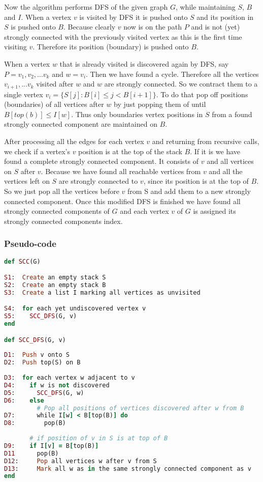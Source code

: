 \documentclass{report}
\theoremstyle{plain}
\theoremstyle{definition}
\theoremstyle{remark}
\numberwithin{definition}{chapter}
\numberwithin{example}{chapter}
\numberwithin{figure}{chapter}
\begin{document}
Now the algorithm performs DFS of the given graph $G$, while maintaining $S$, $B$ and $I$. When a vertex $v$ is visited by DFS it is pushed onto $S$ and its position in $S$ is pushed onto $B$. Because clearly $v$ now is on the path $P$ and is not (yet) strongly connected with the previously visited vertex as this is the first time visiting $v$. Therefore its position (boundary) is pushed onto $B$.

When a vertex $w$ that is already visited is discovered again by DFS, say $P=v_1,v_2,...v_k$ and $w=v_i$. Then we have found a cycle. Therefore all the vertices $v_{i+1},...v_k$ visited after $w$ and $w$ are strongly connected. So we contract them to a single vertex $v_i=\{ S[j] : B[i] \leq j < B[i+1] \}$. To do that pop off positions (boundaries) of all vertices after $w$ by just popping them of until $B[top(b)] \leq I[w]$. Thus only boundaries vertex positions in $S$ from a found strongly connected component are maintained on $B$.

After processing all the edges for each vertex $v$ and returning from recursive calls, we check if a vertex's $v$ position is at the top of the stack $B$. If it is we have found a complete strongly connected component. It consists of $v$ and all vertices on $S$ after $v$. Because we have found all reachable vertices from $v$ and all the vertices left on $S$ are strongly connected to $v$, since its position is at the top of $B$. So we just pop all the vertices before $v$ from S and add them to a new strongly connected component. Once this modified DFS is finished we have found all strongly connected components of $G$ and each vertex $v$ of $G$ is assigned its strongly connected components index.

\subsubsection*{Pseudo-code}

\begin{lstlisting}[language=Ruby]
def SCC(G)

S1:  Create an empty stack S
S2:  Create an empty stack B
S3:  Create a list I marking all vertices as unvisited

S4:  for each yet undiscovered vertex v
S5:    SCC_DFS(G, v)
end

def SCC_DFS(G, v)
  
D1:  Push v onto S
D2:  Push top(S) on B
  
D3:  for each vertex w adjacent to v
D4:    if w is not discovered
D5:      SCC_DFS(G, w)
D6:    else
         # Pop all positions of vertices discovered after w from B
D7:      while I[w] < B[top(B)] do
D8:        pop(B)
  
       # if position of v in S is at top of B
D9:    if I[v] = B[top(B)]
D11      pop(B)
D12:     Pop all vertices w after v from S
D13:     Mark all w as in the same strongly connected component as v
end
\end{lstlisting}
\end{document}
